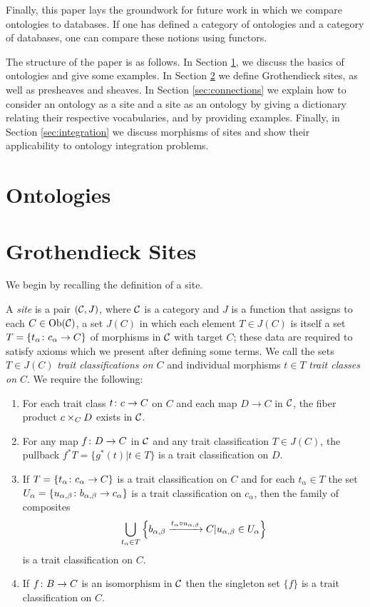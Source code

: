 \documentclass{amsart}
\begin{document}
Finally, this paper lays the groundwork for future work in which we compare ontologies to databases.  If one has defined a category of ontologies and a category of databases, one can compare these notions using functors.  

The structure of the paper is as follows.  In Section \ref{sec:ontologies}, we discuss the basics of ontologies and give some examples.  In Section \ref{sec:sites} we define Grothendieck sites, as well as presheaves and sheaves.  In Section \ref{sec:connections} we explain how to consider an ontology as a site and a site as an ontology by giving a dictionary relating their respective vocabularies, and by providing examples.  Finally, in Section \ref{sec:integration} we discuss morphisms of sites and show their applicability to ontology integration problems.

\section{Ontologies}\label{sec:ontologies}

\section{Grothendieck Sites}\label{sec:sites}

We begin by recalling the definition of a site.

\begin{definition}

A {\em site} is a pair $(\mathcal{C},J)$, where $\mathcal{C}$ is a category and $J$ is a function that assigns to each $C\in\textnormal{Ob}(\mathcal{C})$,  a set $J(C)$ in which each element $T\in J(C)$ is itself a set $T=\{t_\alpha\colon c_\alpha\rightarrow C\}$ of morphisms in $\mathcal{C}$ with target $C$; these data are required to satisfy axioms which we present after defining some terms.  We call the sets $T\in J(C)$ {\em trait classifications on $C$} and individual morphisms $t\in T$ {\em trait classes on $C$}.  We require the following: \begin{enumerate}\item For each trait class $t\colon c\rightarrow C$ on $C$ and each map $D\to C$ in $\mathcal{C}$, the fiber product $c\times_CD$ exists in $\mathcal{C}$.\item For any map $f\colon D\rightarrow C$ in $\mathcal{C}$ and any trait classification $T\in J(C)$, the pullback $f^*T=\{g^*(t)|t\in T\}$ is a trait classification on $D$.\item If $T=\{t_\alpha\colon c_\alpha\rightarrow C\}$ is a trait classification on $C$ and for each $t_\alpha\in T$ the set $U_\alpha=\{u_{\alpha,\beta}\colon b_{\alpha,\beta}\rightarrow c_\alpha\}$ is a trait classification on $c_\alpha$, then the family of composites $$\bigcup_{t_\alpha\in T}\left\{b_{\alpha,\beta}\xrightarrow{t_\alpha\circ u_{\alpha,\beta}}C|u_{\alpha,\beta}\in U_\alpha\right\}$$ is a trait classification on $C$.\item If $f\colon B\rightarrow C$ is an isomorphism in $\mathcal{C}$ then the singleton set $\{f\}$ is a trait classification on $C$.\end{enumerate}

\end{definition}
\end{document}
